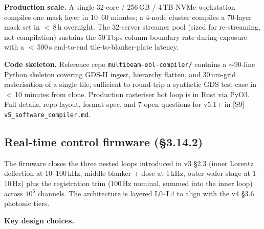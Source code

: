 \documentclass[11pt,letterpaper]{article}
\begin{document}
\textbf{Production scale.} A single 32-core / 256\,GB / 4\,TB NVMe workstation compiles one mask layer in 10--60 minutes; a 4-node cluster compiles a 70-layer mask set in $<$\,8\,h overnight. The 32-server streamer pool (sized for re-streaming, not compilation) sustains the 50\,Tbps column-boundary rate during exposure with a $<$\,500\,\textmu s end-to-end tile-to-blanker-plate latency.

\textbf{Code skeleton.} Reference repo \texttt{multibeam-ebl-compiler/} contains a $\sim$90-line Python skeleton covering GDS-II ingest, hierarchy flatten, and 30\,nm-grid rasterisation of a single tile, sufficient to round-trip a synthetic GDS test case in $<$\,10 minutes from clone. Production rasteriser hot loop is in Rust via PyO3. Full details, repo layout, format spec, and 7 open questions for v5.1+ in [S9] \texttt{v5\_software\_compiler.md}.

\subsection{Real-time control firmware (\S 3.14.2)}

The firmware closes the three nested loops introduced in v3 \S 2.3 (inner Lorentz deflection at 10--100\,kHz, middle blanker + dose at 1\,kHz, outer wafer stage at 1--10\,Hz) plus the registration trim (100\,Hz nominal, summed into the inner loop) across $10^6$ channels. The architecture is layered L0--L4 to align with the v4 \S 3.6 photonic tiers.

\textbf{Key design choices.}
\end{document}
